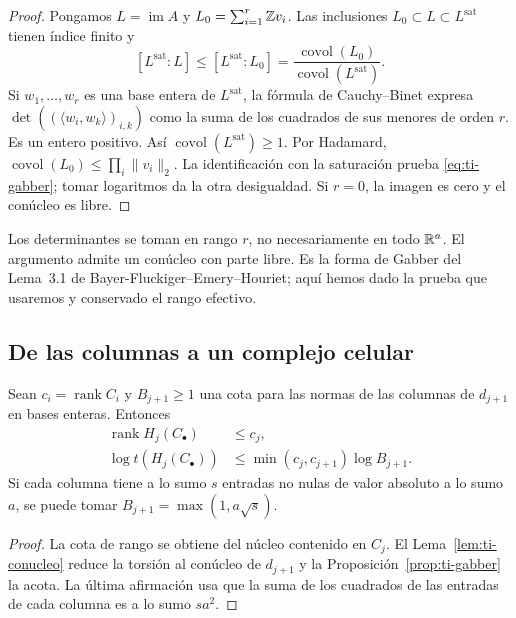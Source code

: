 \begin{proof}
Pongamos $L=\operatorname{im}A$ y
$L_0=\sum_{i=1}^r\mathbb{Z} v_i$. Las inclusiones
$L_0\subset L\subset L^{\mathrm{sat}}$ tienen índice finito y
\[
 [L^{\mathrm{sat}}:L]
 \le[L^{\mathrm{sat}}:L_0]
 =\frac{\operatorname{covol}(L_0)}
        {\operatorname{covol}(L^{\mathrm{sat}})}.
\]
Si $w_1,\ldots,w_r$ es una base entera de $L^{\mathrm{sat}}$,
la fórmula de Cauchy--Binet expresa
$\det((\langle w_i,w_k\rangle)_{i,k})$ como la suma de los
cuadrados de sus menores de orden $r$. Es un entero positivo.
Así $\operatorname{covol}(L^{\mathrm{sat}})\ge1$.
Por Hadamard,
$\operatorname{covol}(L_0)\le\prod_i\|v_i\|_2$.
La identificación con la saturación prueba
\eqref{eq:ti-gabber}; tomar logaritmos da la otra desigualdad.
Si $r=0$, la imagen es cero y el conúcleo es libre.
\end{proof}

Los determinantes se toman en rango $r$, no necesariamente en
todo $\mathbb{R}^a$. El argumento admite un conúcleo con parte libre.
Es la forma de Gabber del Lema~3.1 de
Bayer-Fluckiger--Emery--Houriet; aquí hemos dado la prueba que
usaremos y conservado el rango efectivo.

\subsection{De las columnas a un complejo celular}

\begin{proposicion}
\label{prop:ti-complejo}
Sean $c_i=\operatorname{rank}C_i$ y $B_{j+1}\ge1$ una cota
para las normas de las columnas de $d_{j+1}$ en bases enteras.
Entonces
\begin{equation}
 \begin{aligned}
 \operatorname{rank}H_j(C_\bullet)&\le c_j,\\
 \log t(H_j(C_\bullet))
 &\le\min(c_j,c_{j+1})\log B_{j+1}.
 \end{aligned}
 \label{eq:ti-complejo}
\end{equation}
Si cada columna tiene a lo sumo $s$ entradas no nulas de
valor absoluto a lo sumo $a$, se puede tomar
$B_{j+1}=\max(1,a\sqrt{s})$.
\end{proposicion}

\begin{proof}
La cota de rango se obtiene del núcleo contenido en $C_j$.
El Lema~\ref{lem:ti-conucleo} reduce la torsión al conúcleo
de $d_{j+1}$ y la Proposición~\ref{prop:ti-gabber} la acota.
La última afirmación usa que la suma de los cuadrados de
las entradas de cada columna es a lo sumo $sa^2$.
\end{proof}

